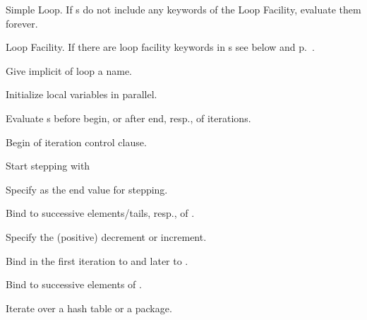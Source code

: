 \begin{LIST}{1cm}

  {
  Simple Loop. If s do
  not include any keywords of the Loop Facility, evaluate them forever. 
  }

  {
  Loop Facility. If there are loop facility keywords in s
  see below and p.\ \pageref{loop-overview}.
  }

  \begin{LIST}{.5cm}
    
    {
    Give implicit  of loop a name.
    }

    {
    Initialize local variables in parallel.
    }

    {
    Evaluate s before begin, or after end, resp., of iterations.
    }

    {
    Begin of iteration control clause.
    }

    \begin{LIST}{.5cm}

      {
      Start stepping with 
      }

      {
      Specify  as the end value for stepping.
      }

      {
      Bind  to successive elements/tails, resp., of .
      }

      {
      Specify the (positive) decrement or increment.
      }

      {
      Bind  in the first iteration to   and later to .
      }

      {
      Bind  to successive elements of .
      }

      {
      Iterate over a hash table or a package.
      }


\end{LIST}
\end{LIST}
\end{LIST}
